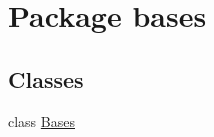 \hypertarget{namespacebases}{}\section{Package bases}
\label{namespacebases}
\subsection*{Classes}
\begin{DoxyCompactItemize}
\item 
class \mbox{\hyperlink{classbases_1_1_bases}{Bases}}
\end{DoxyCompactItemize}
